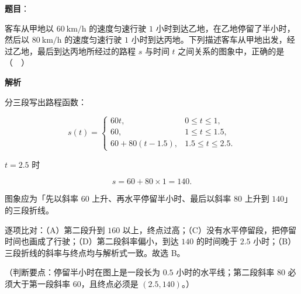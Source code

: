 \begin{answer}

\textbf{题目}：

客车从甲地以 $60\ \mathrm{km/h}$ 的速度匀速行驶 $1$ 小时到达乙地，在乙地停留了半小时，然后以 $80\ \mathrm{km/h}$ 的速度匀速行驶 $1$ 小时到达丙地。下列描述客车从甲地出发，经过乙地，最后到达丙地所经过的路程 $s$ 与时间 $t$ 之间关系的图象中，正确的是（　）
\nopagebreak[4]
\begin{center}\end{center}
\nopagebreak[4]
\textbf{解析}

分三段写出路程函数：

\nopagebreak[4]
\[s(t)=\begin{cases}60t,&0\leqslant t\leqslant1,\\ 60,&1\leqslant t\leqslant1.5,\\ 60+80(t-1.5),&1.5\leqslant t\leqslant2.5.\end{cases}\]

$t=2.5$ 时

\nopagebreak[4]
\[s=60+80\times1=140.\]

图象应为「先以斜率 $60$ 上升、再水平停留半小时、最后以斜率 $80$ 上升到 $140$」的三段折线。

逐项比对：（A）第二段升到 $160$ 以上，终点过高；（C）没有水平停留段，把停留时间也画成了行驶；（D）第二段斜率偏小，到达 $140$ 的时间晚于 $2.5$ 小时；（B）三段折线的斜率与终点均与解析式一致。故选 B。

（判断要点：停留半小时在图上是一段长为 $0.5$ 小时的水平线；第二段斜率 $80$ 必须大于第一段斜率 $60$，且终点必须是 $(2.5,140)$。）


\end{answer}
